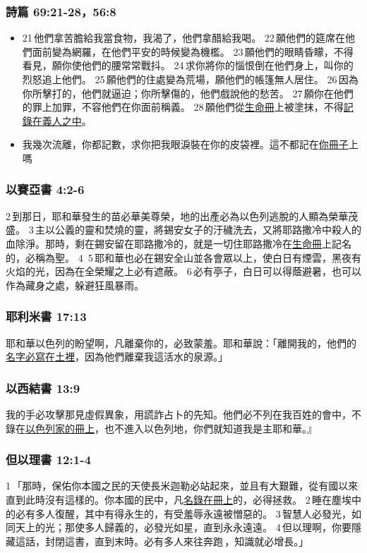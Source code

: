 \subsubsection{詩篇 69:21-28，56:8}
\begin{itemize} 
\itemsep-.35em 
\item 21 他們拿苦膽給我當食物，我渴了，他們拿醋給我喝。
22 願他們的筵席在他們面前變為網羅，在他們平安的時候變為機檻。
23 願他們的眼睛昏矇，不得看見，願你使他們的腰常常戰抖。
24 求你將你的惱恨倒在他們身上，叫你的烈怒追上他們。
25 願他們的住處變為荒場，願他們的帳篷無人居住。
26 因為你所擊打的，他們就逼迫；你所擊傷的，他們戲說他的愁苦。
27 願你在他們的罪上加罪，不容他們在你面前稱義。
28 願他們從\underline{生命冊}上被塗抹，不得\underline{記錄在義人之中}。
\item 我幾次流離，你都記數，求你把我眼淚裝在你的皮袋裡。這不都記在\underline{你冊子}上嗎
\end{itemize}

\subsubsection{以賽亞書 4:2-6}
2 到那日，耶和華發生的苗必華美尊榮，地的出產必為以色列逃脫的人顯為榮華茂盛。 3 主以公義的靈和焚燒的靈，將錫安女子的汙穢洗去，又將耶路撒冷中殺人的血除淨。那時，剩在錫安留在耶路撒冷的，就是一切住耶路撒冷在\underline{生命冊}上記名的，必稱為聖。 4  5 耶和華也必在錫安全山並各會眾以上，使白日有煙雲，黑夜有火焰的光，因為在全榮耀之上必有遮蔽。 6 必有亭子，白日可以得蔭避暑，也可以作為藏身之處，躲避狂風暴雨。


\subsubsection{耶利米書 17:13}
耶和華以色列的盼望啊，凡離棄你的，必致蒙羞。耶和華說：「離開我的，他們的\underline{名字必寫在土裡}，因為他們離棄我這活水的泉源。」

\subsubsection{以西結書 13:9}
我的手必攻擊那見虛假異象，用謊詐占卜的先知。他們必不列在我百姓的會中，不錄在\underline{以色列家的冊上}，也不進入以色列地，你們就知道我是主耶和華。』



\subsubsection{但以理書 12:1-4}
1 「那時，保佑你本國之民的天使長米迦勒必站起來，並且有大艱難，從有國以來直到此時沒有這樣的。你本國的民中，凡\underline{名錄在冊上}的，必得拯救。 2 睡在塵埃中的必有多人復醒，其中有得永生的，有受羞辱永遠被憎惡的。 3 智慧人必發光，如同天上的光；那使多人歸義的，必發光如星，直到永永遠遠。 4 但以理啊，你要隱藏這話，封閉這書，直到末時。必有多人來往奔跑 ，知識就必增長。」

